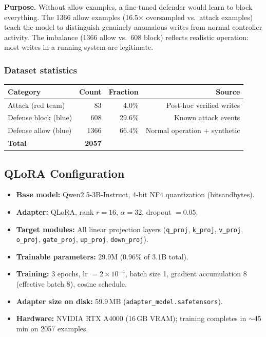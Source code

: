 \documentclass[11pt]{article}
\begin{document}
\textbf{Purpose.} Without allow examples, a fine-tuned defender would learn to block everything. The 1366 allow examples (16.5$\times$ oversampled vs.\ attack examples) teach the model to distinguish genuinely anomalous writes from normal controller activity. The imbalance (1366 allow vs.\ 608 block) reflects realistic operation: most writes in a running system are legitimate.

\subsubsection*{Dataset statistics}

\begin{center}
\begin{tabular}{lrrr}
\toprule
\textbf{Category} & \textbf{Count} & \textbf{Fraction} & \textbf{Source} \\
\midrule
Attack (red team)       & 83    & 4.0\%  & Post-hoc verified writes \\
Defense block (blue)    & 608   & 29.6\% & Known attack events \\
Defense allow (blue)    & 1366  & 66.4\% & Normal operation + synthetic \\
\midrule
\textbf{Total}          & \textbf{2057} & & \\
\bottomrule
\end{tabular}
\end{center}

\subsection*{QLoRA Configuration}

\begin{itemize}[leftmargin=1.5em,nosep]
    \item \textbf{Base model:} Qwen2.5-3B-Instruct, 4-bit NF4 quantization (bitsandbytes).
    \item \textbf{Adapter:} QLoRA, rank $r{=}16$, $\alpha{=}32$, dropout $= 0.05$.
    \item \textbf{Target modules:} All linear projection layers (\texttt{q\_proj}, \texttt{k\_proj}, \texttt{v\_proj}, \texttt{o\_proj}, \texttt{gate\_proj}, \texttt{up\_proj}, \texttt{down\_proj}).
    \item \textbf{Trainable parameters:} 29.9M (0.96\% of 3.1B total).
    \item \textbf{Training:} 3 epochs, lr $= 2{\times}10^{-4}$, batch size 1, gradient accumulation 8 (effective batch 8), cosine schedule.
    \item \textbf{Adapter size on disk:} 59.9\,MB (\texttt{adapter\_model.safetensors}).
    \item \textbf{Hardware:} NVIDIA RTX A4000 (16\,GB VRAM); training completes in $\sim$45\,min on 2057 examples.
\end{itemize}
\end{document}
